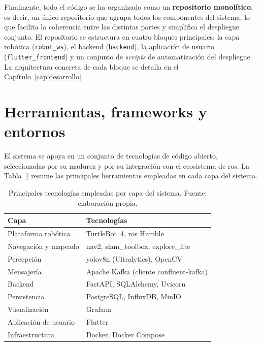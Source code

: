 Finalmente, todo el código se ha organizado como un \textbf{repositorio monolítico}, es decir,
un único repositorio que agrupa todos los componentes del sistema, lo que facilita
la coherencia entre las distintas partes y simplifica el despliegue conjunto. El
repositorio se estructura en cuatro bloques principales: la capa robótica
(\texttt{robot\_ws}), el backend (\texttt{backend}), la aplicación de usuario
(\texttt{flutter\_frontend}) y un conjunto de \textit{scripts} de automatización
del despliegue. La arquitectura concreta de cada bloque se detalla en el
Capítulo~\ref{cap:desarrollo}.

\section{Herramientas, frameworks y entornos}
\label{sec:herramientas}

El sistema se apoya en un conjunto de tecnologías de código abierto, seleccionadas
por su madurez y por su integración con el ecosistema de \gls{ros}. La
Tabla~\ref{tab:tecnologias} resume las principales herramientas empleadas en cada
capa del sistema.

\begin{table}[htbp]
  \centering
  \caption{Principales tecnologías empleadas por capa del sistema. Fuente:
  elaboración propia.}
  \label{tab:tecnologias}
  \begin{tabular}{@{}lp{8.5cm}@{}}
    \toprule
    \textbf{Capa} & \textbf{Tecnologías} \\
    \midrule
    Plataforma robótica & TurtleBot~4, \gls{ros} Humble \\
    Navegación y mapeado & \gls{nav2}, slam\_toolbox, explore\_lite \\
    Percepción & \gls{yolo}v8n (Ultralytics), OpenCV \\
    Mensajería & Apache Kafka (cliente confluent-kafka) \\
    Backend & FastAPI, SQLAlchemy, Uvicorn \\
    Persistencia & PostgreSQL, InfluxDB, MinIO \\
    Visualización & Grafana \\
    Aplicación de usuario & Flutter \\
    Infraestructura & Docker, Docker Compose \\
    \bottomrule
  \end{tabular}
\end{table}

